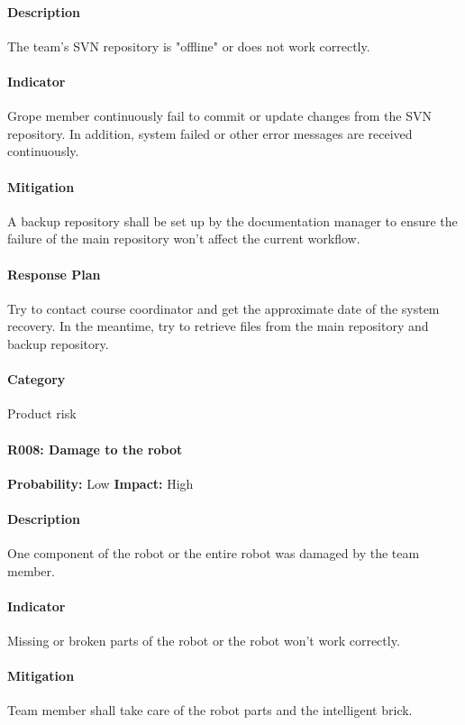 \documentclass[11pt, a4paper]{report}
\begin{document}
	\paragraph{Description}The team's SVN repository is "offline" or does not work correctly.
	\paragraph{Indicator}Grope member continuously fail to commit or update changes from the SVN repository. In addition, system failed or other error messages are received continuously.
	\paragraph{Mitigation}A backup repository shall be set up by the documentation manager to ensure the failure of the main repository won't affect the current workflow.
	\paragraph{Response Plan}Try to contact course coordinator and get the approximate date of the system recovery. In the meantime, try to retrieve files from the main repository and backup repository.\\
	\paragraph{Category} Product risk
	
\pagebreak
	\paragraph{R008: Damage to the robot} \hspace{1cm} \textbf{Probability: }Low\hspace{1cm}   \textbf{Impact: }High
	\paragraph{Description}One component of the robot or the entire robot was damaged by the team member.
	\paragraph{Indicator}Missing or broken parts of the robot or the robot won't work correctly.
	\paragraph{Mitigation}Team member shall take care of the robot parts and the intelligent brick.
\end{document}
